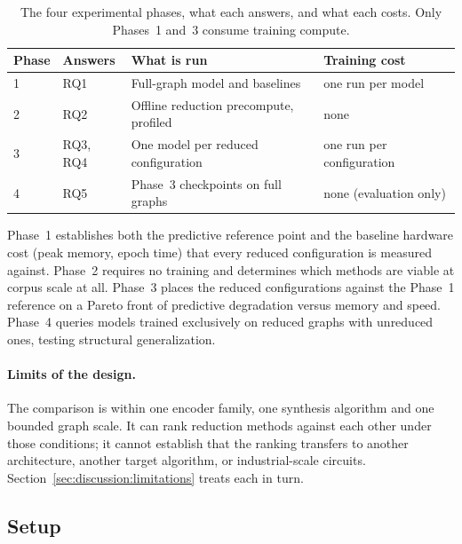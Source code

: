 \begin{table}[htbp]
\centering
\caption{The four experimental phases, what each answers, and what each costs. Only
Phases~1 and~3 consume training compute.}
\label{tab:experiment_phases}
\small
\begin{tabular}{llll}
\toprule
\textbf{Phase} & \textbf{Answers} & \textbf{What is run} & \textbf{Training cost} \\
\midrule
1 & RQ1      & Full-graph model and baselines        & one run per model \\
2 & RQ2      & Offline reduction precompute, profiled & none \\
3 & RQ3, RQ4 & One model per reduced configuration    & one run per configuration \\
4 & RQ5      & Phase~3 checkpoints on full graphs     & none (evaluation only) \\
\bottomrule
\end{tabular}
\end{table}

Phase~1 establishes both the predictive reference point and the baseline hardware cost
(peak memory, epoch time) that every reduced configuration is measured against. Phase~2
requires no training and determines which methods are viable at corpus scale at all.
Phase~3 places the reduced configurations against the Phase~1 reference on a Pareto front
of predictive degradation versus memory and speed. Phase~4 queries models trained
exclusively on reduced graphs with unreduced ones, testing structural generalization.

\paragraph{Limits of the design.}
The comparison is within one encoder family, one synthesis algorithm and one bounded graph
scale. It can rank reduction methods against each other under those conditions; it cannot
establish that the ranking transfers to another architecture, another target algorithm, or
industrial-scale circuits. Section~\ref{sec:discussion:limitations} treats each in turn.

\subsection{Setup}
\label{sec:method:experiment:setup}

